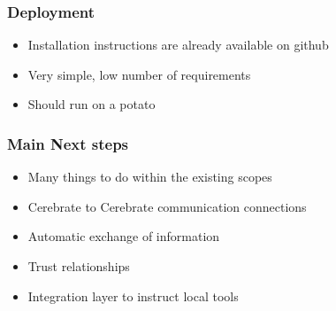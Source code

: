 \begin{frame}
	\frametitle{Deployment}
	\begin{itemize}
		\item Installation instructions are already available on github
                \item Very simple, low number of requirements
                \item Should run on a potato
	\end{itemize}
\end{frame}

\begin{frame}
	\frametitle{Main Next steps}
	\begin{itemize}
                \item Many things to do within the existing scopes
		\item Cerebrate to Cerebrate communication connections
                \item Automatic exchange of information
                \item Trust relationships
                \item Integration layer to instruct local tools
	\end{itemize}
\end{frame}




